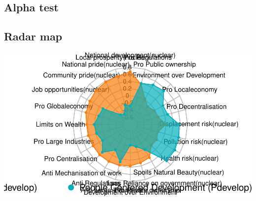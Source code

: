 \documentclass[
]{article}
\begin{document}
\hypertarget{alpha-test-1}{%
\subsection{Alpha test}\label{alpha-test-1}}

\newpage

\hypertarget{radar-map}{%
\subsection{Radar map}\label{radar-map}}

\includegraphics[width=1\linewidth,height=1\textheight]{withmice_files/figure-latex/unnamed-chunk-21-1}
\end{document}
